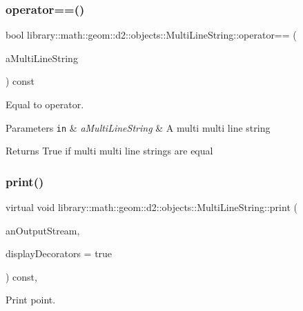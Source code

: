 \subsubsection{\texorpdfstring{operator==()}{operator==()}}
{\footnotesize\ttfamily bool library\+::math\+::geom\+::d2\+::objects\+::\+Multi\+Line\+String\+::operator== (\begin{DoxyParamCaption}\item[{const \hyperlink{classlibrary_1_1math_1_1geom_1_1d2_1_1objects_1_1_multi_line_string}{Multi\+Line\+String} \&}]{a\+Multi\+Line\+String }\end{DoxyParamCaption}) const}



Equal to operator. 


\begin{DoxyParams}[1]{Parameters}
\mbox{\tt in}  & {\em a\+Multi\+Line\+String} & A multi multi line string \\
\hline
\end{DoxyParams}
\begin{DoxyReturn}{Returns}
True if multi multi line strings are equal 
\end{DoxyReturn}
\mbox{\label{classlibrary_1_1math_1_1geom_1_1d2_1_1objects_1_1_multi_line_string_ab7854c1006501bf5159b890a662198b1}} 
\subsubsection{\texorpdfstring{print()}{print()}}
{\footnotesize\ttfamily virtual void library\+::math\+::geom\+::d2\+::objects\+::\+Multi\+Line\+String\+::print (\begin{DoxyParamCaption}\item[{std\+::ostream \&}]{an\+Output\+Stream,  }\item[{bool}]{display\+Decorators = {\ttfamily true} }\end{DoxyParamCaption}) const\hspace{0.3cm}{\ttfamily [override]}, {\ttfamily [virtual]}}



Print point. 


